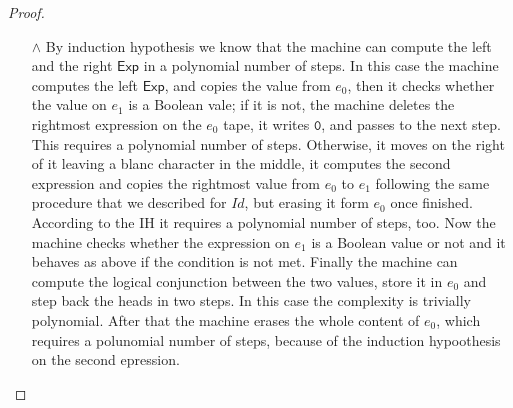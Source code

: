 \documentclass[10pt]{amsart}
\newcommand{\zero}{\mathtt{0}}
\newcommand{\xp}{\mathsf{Exp}}
\begin{document}
\begin{proof}
\begin{itemize}
\item[$\land$] By induction hypothesis we know that the machine can compute the left and the right $\xp$ in a polynomial number of steps. In this case the machine computes the left $\xp$, and copies the value from $e_0$, then it checks whether the value on $e_1$ is a Boolean vale; if it is not, the machine deletes the rightmost expression on the $e_0$ tape, it writes $\zero$, and passes to the next step. This requires a polynomial number of steps. Otherwise, it moves on the right of it leaving a blanc character in the middle, it computes the second expression and copies the rightmost value from $e_0$ to $e_1$ following the same procedure that we described for $Id$, but erasing it form $e_0$ once finished. According to the IH it requires a polynomial number of steps, too. Now the machine checks whether the expression on $e_1$ is a Boolean value or not and it behaves as above if the condition is not met. Finally the machine can compute the logical conjunction between the two values, store it in $e_0$ and step back the heads in two steps. In this case the complexity is trivially polynomial. After that the machine erases the whole content of $e_0$, which requires a polunomial number of steps, because of the induction hypoothesis on the second epression.
\end{itemize}


\end{proof}
\end{document}
